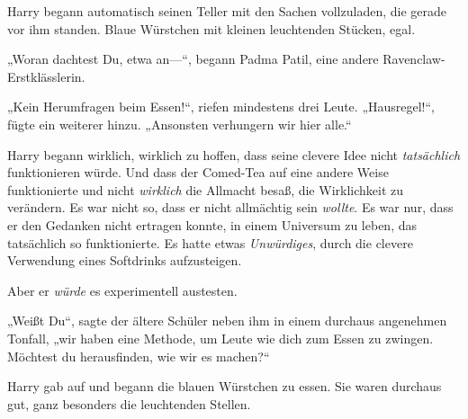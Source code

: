 Harry begann automatisch seinen Teller mit den Sachen vollzuladen, die gerade vor ihm standen. Blaue Würstchen mit kleinen leuchtenden Stücken, egal.

„Woran dachtest Du, etwa an—“, begann Padma Patil, eine andere Ravenclaw-Erstklässlerin.

„Kein Herumfragen beim Essen!“, riefen mindestens drei Leute. „Hausregel!“, fügte ein weiterer hinzu. „Ansonsten verhungern wir hier alle.“

Harry begann wirklich, wirklich zu hoffen, dass seine clevere Idee nicht \emph{tatsächlich} funktionieren würde. Und dass der Comed-Tea auf eine andere Weise funktionierte und nicht \emph{wirklich} die Allmacht besaß, die Wirklichkeit zu verändern. Es war nicht so, dass er nicht allmächtig sein \emph{wollte}. Es war nur, dass er den Gedanken nicht ertragen konnte, in einem Universum zu leben, das tatsächlich so funktionierte. Es hatte etwas \emph{Unwürdiges}, durch die clevere Verwendung eines Softdrinks aufzusteigen.

Aber er \emph{würde} es experimentell austesten.

„Weißt Du“, sagte der ältere Schüler neben ihm in einem durchaus angenehmen Tonfall, „wir haben eine Methode, um Leute wie dich zum Essen zu zwingen. Möchtest du herausfinden, wie wir es machen?“

Harry gab auf und begann die blauen Würstchen zu essen. Sie waren durchaus gut, ganz besonders die leuchtenden Stellen.

